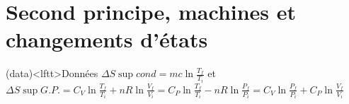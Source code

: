 \documentclass[a4paper, 10pt, final, garamond]{book}
\begin{document}
\setcounter{chapter}{27}


\chapter{Second principe, machines et changements d'états}

\vspace{-20pt}
\begin{tcn}(data)<lftt>{Données}
	$\Delta{S}\sup{cond} = mc \ln \frac{T_f}{T_i}$
	\hspace{20pt}
	et
	\hspace{20pt}
	$\Delta{S}\sup{G.P.} =
		C_V \ln \frac{T_f}{T_i} + nR \ln \frac{V_f}{V_i} =
		C_P \ln \frac{T_f}{T_i} - nR \ln \frac{P_f}{P_i} =
		C_V \ln \frac{P_f}{P_i} + C_P \ln \frac{V_f}{V_i}$
	\vspace{-15pt}
\end{tcn}
\end{document}
